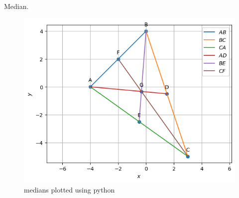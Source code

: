 \begin{table}[H]
        \centering
        
        \caption{Median.}
        \label{tab:Median}
    \end{table}
\begin{figure}[H]
\includegraphics[width=\columnwidth]{median/figs/median.png}
\caption{medians plotted using python}
\label{fig:i_median_py}
\end{figure}

